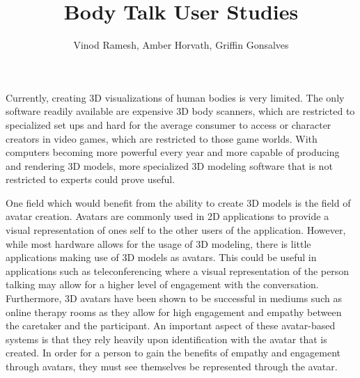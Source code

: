 \documentclass[journal]{vgtc}                %
\title{Body Talk User Studies}
\author{Vinod Ramesh, Amber Horvath, Griffin Gonsalves }
\begin{document}


\maketitle

\noindent Currently, creating 3D visualizations of human bodies is very limited. The only software readily available are expensive 3D body scanners,
which are restricted to specialized set ups and hard for the average consumer to access or character creators in video games, which are restricted to
those game worlds. With computers becoming more powerful every year and more capable of producing and rendering 3D models, more specialized 3D modeling
software that is not restricted to experts could prove useful. \newline

\noindent One field which would benefit from the ability to create 3D models is the field
of avatar creation. Avatars are commonly used in 2D applications to provide a visual representation of ones self to the other users of the application.
However, while most hardware allows for the usage of 3D modeling, there is little applications making use of 3D models as avatars. This could be useful
in applications such as teleconferencing where a visual representation of the person talking may allow for a higher level of engagement with the
conversation. Furthermore, 3D avatars have been shown to be successful in mediums such as online therapy rooms as they allow for high engagement
and empathy between the caretaker and the participant\cite{Rijn:2015:BJGC}. An important aspect of these avatar-based systems is that they rely
heavily upon identification with the avatar that is created. In order for a person to gain the benefits of empathy and engagement through avatars,
they must see themselves be represented through the avatar\cite{Belisle:2010:PM}. \newline
\end{document}
